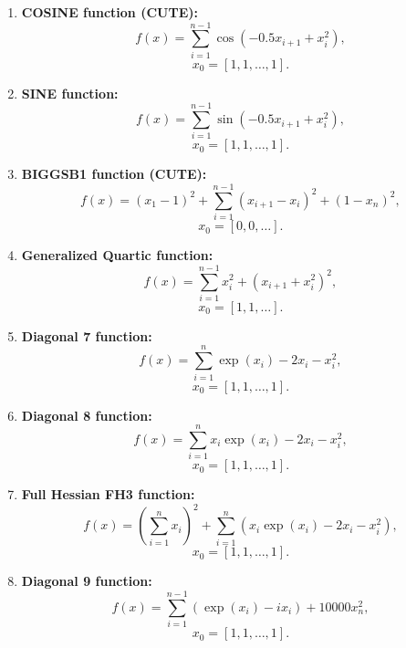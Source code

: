 \documentclass[10pt]{article}
\begin{document}
\begin{enumerate}
    \item \textbf{COSINE function (CUTE):}
    \[
    f(x) = \sum_{i=1}^{n-1} \cos(-0.5 x_{i+1} + x_i^2),
    \]
    \[
    x_0 = [1, 1, \dots, 1].
    \]

    \item \textbf{SINE function:}
    \[
    f(x) = \sum_{i=1}^{n-1} \sin(-0.5 x_{i+1} + x_i^2),
    \]
    \[
    x_0 = [1, 1, \dots, 1].
    \]

    \item \textbf{BIGGSB1 function (CUTE):}
    \[
    f(x) = (x_1 - 1)^2 + \sum_{i=1}^{n-1} \left( x_{i+1} - x_i\right)^2 + (1 - x_n)^2,
    \]
    \[
    x_0 = [0, 0, \dots].
    \]

    \item \textbf{Generalized Quartic function:}
    \[
    f(x) = \sum_{i=1}^{n-1} x_i^2 + (x_{i+1} + x_i^2)^2,
    \]
    \[
    x_0 = [1, 1, \dots].
    \]

    \item \textbf{Diagonal 7 function:}
    \[
    f(x) = \sum_{i=1}^{n} \exp(x_i) - 2x_i - x_i^2,
    \]
    \[
    x_0 = [1, 1, \dots, 1].
    \]

    \item \textbf{Diagonal 8 function:}
    \[
    f(x) = \sum_{i=1}^{n} x_i\exp(x_i) - 2x_i - x_i^2,
    \]
    \[
    x_0 = [1, 1, \dots, 1].
    \]

    \item \textbf{Full Hessian FH3 function:}
    \[
    f(x) = \left(\sum_{i=1}^{n}x_i \right)^2 + \sum_{i=1}^{n} (x_i\exp(x_i) - 2x_i - x_i^2),
    \]
    \[
    x_0 = [1, 1, \dots, 1].
    \]

    \item \textbf{Diagonal 9 function:}
    \[
    f(x) = \sum_{i=1}^{n-1} \left( \exp(x_i) - i x_i \right) + 10000x_n^2,
    \]
    \[
    x_0 = [1, 1, \dots, 1].
    \]

\end{enumerate}
\end{document}
